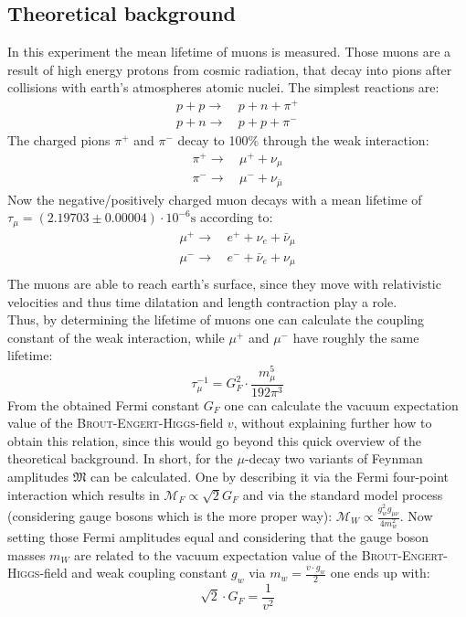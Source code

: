\documentclass[english,  %
parskip=full,   %
headsepline]{scrartcl}
\begin{document}
\subsection{Theoretical background}
In this experiment the mean lifetime of muons is measured. Those muons are a result of high energy protons from cosmic radiation, that decay into pions after collisions with earth's atmospheres atomic nuclei. The simplest reactions are:
\begin{align*}
    p+p \rightarrow& \,p+n+\pi^+\\
    p+n \rightarrow& \,p+p+\pi^-
\end{align*}
The charged pions $\pi^+$ and $\pi^-$ decay to 100\% through the weak interaction:
\begin{align*}
    \pi^+ \rightarrow& \, \mu^+ +\nu_{\mu}\\
    \pi^- \rightarrow& \, \mu^- +\nu_{\bar{\mu}}
\end{align*}
Now the negative/positively charged muon decays with a mean lifetime of \\$\tau_{\mu} = (2.19703 \pm 0.00004)\cdot 10^{-6}\si{\second}$ \cite{Zyla:2020zbs} according to:
\begin{align*}
    \mu^+ \rightarrow& \, e^+ + \nu_e + \bar{\nu}_{\mu}\\
    \mu^- \rightarrow& \, e^- + \bar{\nu}_e + \nu_{\mu}\\
\end{align*}
The muons are able to reach earth's surface, since they move with relativistic velocities and thus time dilatation and length contraction play a role.\\
Thus, by determining the lifetime of muons one can calculate the coupling constant of the weak interaction, while $\mu^+$ and $\mu^-$ have roughly the same lifetime:
\begin{equation}
\label{eq:fermi}
    \tau_{\mu}^{-1} = G_F^2\cdot \frac{m_{\mu}^5}{192\pi^3}
\end{equation}
From the obtained Fermi constant $G_F$ one can calculate the vacuum expectation value of the \textsc{Brout-Engert-Higgs}-field $v$, without explaining further how to obtain this relation, since this would go beyond this quick overview of the theoretical background. In short, for the $\mu$-decay two variants of Feynman amplitudes $\mathfrak{M}$ can be calculated. One by describing it via the Fermi four-point interaction which results in $\mathcal{M}_F\propto \sqrt{2}G_F$ and via the standard model process (considering gauge bosons which is the more proper way): $\mathcal{M}_W\propto\frac{g_w^2g_{\mu\nu}}{4m^2_w}$. Now setting those Fermi amplitudes equal and considering that the gauge boson masses $m_W$ are related to the vacuum expectation value of the \textsc{Brout-Engert-Higgs}-field and weak coupling constant $g_w$ via $m_w=\frac{v\cdot g_w}{2}$ one ends up with:
\begin{equation}
   \sqrt{2}\cdot G_F = \frac{1}{v^2}
   \label{eq:higgs}
\end{equation}
\end{document}
